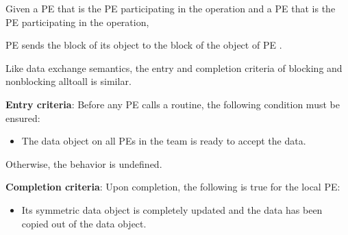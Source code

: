 \begin{apidefinition}
{    Given a \ac{PE}  that is the \kth \ac{PE}
    participating in the operation and a \ac{PE}
     that is the \lth \ac{PE}
    participating in the operation,

    \ac{PE}  sends the \lth block of its  object to
    the \kth block of
    the  object of \ac{PE} .

    
    Like data exchange semantics, the entry and completion
    criteria of blocking and nonblocking alltoall is similar. 

    {\bf Entry criteria}: Before any \ac{PE} calls a  routine,
    the following condition must be ensured:
    \begin{itemize}
    \item The  data object on all \acp{PE} in the team is
      ready to accept the  data.
    \end{itemize}
    Otherwise, the behavior is undefined.

    {\bf Completion criteria}: Upon completion, the following is true for
    the local PE:
    \begin{itemize}
    \item Its  symmetric data object is completely updated and
    the data has been copied out of the  data object.
    \end{itemize}
}


\end{apidefinition}

